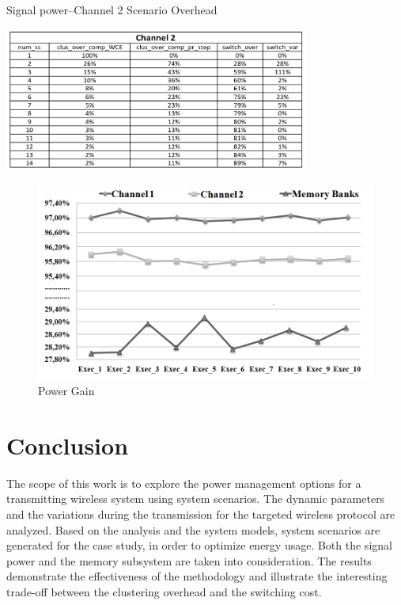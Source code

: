 \begin{table}
\centering
	\caption{Signal power–Channel 2 Scenario Overhead}
	\label{tab:F3}
	\includegraphics[width=0.75\textwidth]{F/tab3.png}
\end{table} 

\begin{figure}
\centering
\includegraphics[width=\textwidth]{F/image15.png}
\caption{Power Gain}
\label{fig:F8}
\end{figure}	 

\section{Conclusion} 

The scope of this work is to explore the power management options for a transmitting wireless system using system scenarios. The dynamic parameters and the variations during the transmission for the targeted wireless protocol are analyzed. Based on the analysis and the system models, system scenarios are generated for the case study, in order to optimize energy usage. Both the signal power and the memory subsystem are taken into consideration. The results demonstrate the effectiveness of the methodology and illustrate the interesting trade-off between the clustering overhead and the switching cost. 
	

	
	
